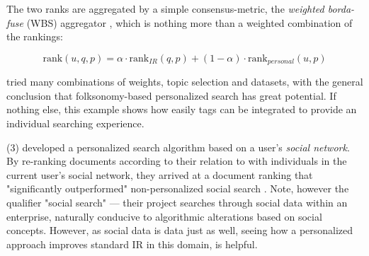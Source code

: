 The two ranks are aggregated by a simple consensus-metric, the
\emph{weighted borda-fuse} (WBS) aggregator \cite[p3]{Xu2008}, 
which is nothing more than a weighted combination of the rankings:

\begin{equation*}
  \mathrm{rank}(u,q,p) = \alpha \cdot \mathrm{rank}_{IR}(q,p) 
                 + (1-\alpha) \cdot \mathrm{rank}_{personal}(u,p)
\end{equation*}

\citeauthor{Xu2008} tried many combinations of weights,
topic selection and datasets, with the general conclusion
that folksonomy-based personalized search has great potential.
If nothing else, this example shows how easily tags can be integrated
to provide an individual searching experience.


% 


(3) \cite{Carmel2009} developed a personalized search algorithm based on a user's \emph{social network}.
By re-ranking documents according to their relation to with individuals in the current user's social network,
they arrived at a document ranking that "significantly outperformed" non-personalized social search \cite[p1]{Carmel2009}.
Note, however the qualifier "social search" --- their project searches through social data within an enterprise, 
naturally conducive to algorithmic alterations based on social concepts. However, as social data is data just as well,
seeing how a personalized approach improves standard IR in this domain, is helpful.

